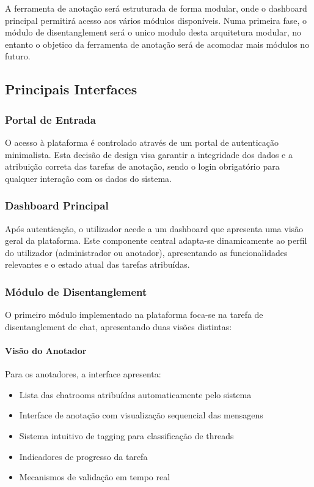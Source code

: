 A ferramenta de anotação será estruturada de forma modular, onde o dashboard principal permitirá acesso aos vários módulos disponíveis. Numa primeira fase, o módulo de disentanglement será o unico modulo desta arquitetura modular, no entanto o objetico da ferramenta de anotação será de acomodar mais módulos no futuro.

\subsection{Principais Interfaces}

\subsubsection{Portal de Entrada}
O acesso à plataforma é controlado através de um portal de autenticação minimalista. Esta decisão de design visa garantir a integridade dos dados e a atribuição correta das tarefas de anotação, sendo o login obrigatório para qualquer interação com os dados do sistema.

\subsubsection{Dashboard Principal}
Após autenticação, o utilizador acede a um dashboard que apresenta uma visão geral da plataforma. Este componente central adapta-se dinamicamente ao perfil do utilizador (administrador ou anotador), apresentando as funcionalidades relevantes e o estado atual das tarefas atribuídas.

\subsubsection{Módulo de Disentanglement}
O primeiro módulo implementado na plataforma foca-se na tarefa de disentanglement de chat, apresentando duas visões distintas:

\paragraph{Visão do Anotador}
Para os anotadores, a interface apresenta:
\begin{itemize}
    \item Lista das chatrooms atribuídas automaticamente pelo sistema
    \item Interface de anotação com visualização sequencial das mensagens
    \item Sistema intuitivo de tagging para classificação de threads
    \item Indicadores de progresso da tarefa
    \item Mecanismos de validação em tempo real
\end{itemize}

